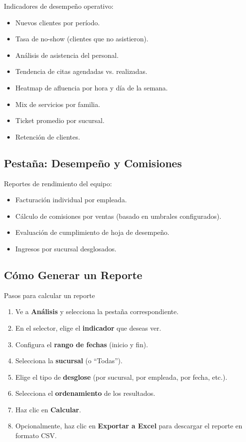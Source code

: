 \documentclass[12pt,a4paper]{article}
\begin{document}
Indicadores de desempeño operativo:

\begin{itemize}[leftmargin=*]
  \item Nuevos clientes por período.
  \item Tasa de no-show (clientes que no asistieron).
  \item Análisis de asistencia del personal.
  \item Tendencia de citas agendadas vs. realizadas.
  \item Heatmap de afluencia por hora y día de la semana.
  \item Mix de servicios por familia.
  \item Ticket promedio por sucursal.
  \item Retención de clientes.
\end{itemize}

\subsection{Pestaña: Desempeño y Comisiones}

Reportes de rendimiento del equipo:

\begin{itemize}[leftmargin=*]
  \item Facturación individual por empleada.
  \item Cálculo de comisiones por ventas (basado en umbrales configurados).
  \item Evaluación de cumplimiento de hoja de desempeño.
  \item Ingresos por sucursal desglosados.
\end{itemize}

\subsection{Cómo Generar un Reporte}

\begin{pasobox}{Pasos para calcular un reporte}
\begin{enumerate}[leftmargin=*]
  \item Ve a \textbf{Análisis} y selecciona la pestaña correspondiente.
  \item En el selector, elige el \textbf{indicador} que deseas ver.
  \item Configura el \textbf{rango de fechas} (inicio y fin).
  \item Selecciona la \textbf{sucursal} (o ``Todas'').
  \item Elige el tipo de \textbf{desglose} (por sucursal, por empleada, por fecha, etc.).
  \item Selecciona el \textbf{ordenamiento} de los resultados.
  \item Haz clic en \textbf{Calcular}.
  \item Opcionalmente, haz clic en \textbf{Exportar a Excel} para descargar el reporte en formato CSV.
\end{enumerate}
\end{pasobox}
\end{document}

